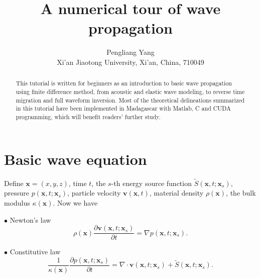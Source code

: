 

\title{A numerical tour of wave propagation}
\renewcommand{\thefootnote}{\fnsymbol{footnote}}
\author{Pengliang Yang\footnotemark[1]\\
\footnotemark[1]Xi'an Jiaotong University, Xi'an, China, 710049
}
\usetikzlibrary{decorations.pathreplacing} 
\usetikzlibrary{scopes}


\maketitle
\begin{abstract}
 This tutorial is written for beginners as an introduction to basic wave propagation using finite difference method, from acoustic and elastic wave modeling, to reverse time migration and full waveform inversion. Most of the theoretical delineations summarized in this tutorial have been implemented in Madagascar with Matlab, C and CUDA programming, which will benefit readers' further study.
\end{abstract}

\section{Basic wave equation}

Define  $\textbf{x}=(x,y,z)$, time $t$, the $s$-th energy source function $ \tilde{S}(\textbf{x},t;\textbf{x}_s) $, pressure $p(\textbf{x},t; \textbf{x}_s)$, particle velocity $ \textbf{v}(\textbf{x},t) $, material density $ \rho(\textbf{x}) $, the bulk modulus $\kappa(\textbf{x})$. Now we have
\begin{description}
	\item $\bullet$ Newton's law
	\begin{equation}\label{eq:newton}
	\rho(\textbf{x})\frac{\partial\textbf{v}(\textbf{x},t;\textbf{x}_s)}{\partial t}=\nabla p(\textbf{x},t;\textbf{x}_s).
	\end{equation}

	\item $\bullet$ Constitutive law
	\begin{equation}\label{eq:constitutive}
	\frac{1}{\kappa(\textbf{x})}\frac{\partial p(\textbf{x},t;\textbf{x}_s)}{\partial t}=\nabla \cdot \textbf{v}(\textbf{x},t;\textbf{x}_s)+\tilde{S}(\textbf{x},t;\textbf{x}_s).
	\end{equation}
\end{description}

